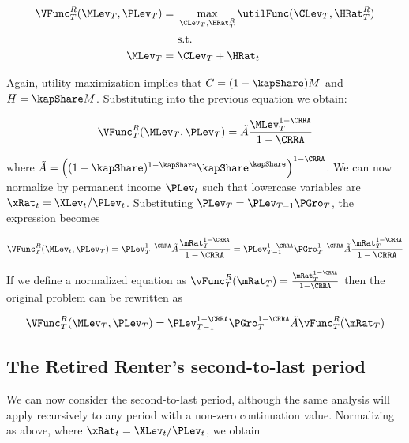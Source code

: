\documentclass[PortfolioChoiceWithRiskyHousing]{subfiles}
\begin{document}
\begin{equation}
	\begin{split}
		\VFunc^R_{T}(\MLev_{T}, \PLev_{T}) = &~ \max_{\CLev_{T}, \HRat^R_{T}} \utilFunc(\CLev_{T}, \HRat^R_{T}) \\
		&~ \text{s.t.} \\
		\MLev_{T} = &~ \CLev_{T} + \HRat_{t}
	\end{split}
\end{equation}

Again, utility maximization implies that $C = (1-\kapShare)M$ and $H = \kapShare M$. Substituting into the previous equation we obtain:

\begin{equation}
	\VFunc^R_{T}(\MLev_{T}, \PLev_{T}) = \tilde{A} \frac{\MLev_{T}^{1-\CRRA}}{1-\CRRA}
\end{equation}

where $\tilde{A} = \left( (1-\kapShare)^{1-\kapShare} \kapShare^\kapShare \right)^{1-\CRRA}$. We can now normalize by permanent income $\PLev_{t}$ such that lowercase variables are $\xRat_{t} = \XLev_{t} / \PLev_{t}$. Substituting $\PLev_{T} = \PLev_{T-1} \PGro_{T}$, the expression becomes

\begin{equation}
	\VFunc^R_{T}(\MLev_{t}, \PLev_{T}) = \PLev_{T}^{1-\CRRA} \tilde{A} \frac{ \mRat_{T}^{1-\CRRA}}{1-\CRRA} = \PLev_{T-1}^{1-\CRRA} \PGro_{T}^{1-\CRRA} \tilde{A} \frac{\mRat_{T}^{1-\CRRA}}{1-\CRRA}
\end{equation}

If we define a normalized equation as $\vFunc^R_{T}(\mRat_{T}) = \frac{\mRat_{T}^{1-\CRRA}}{1-\CRRA}$ then the original problem can be rewritten as

\begin{equation}
	\VFunc^R_{T}(\MLev_{T}, \PLev_{T}) = \PLev_{T-1}^{1-\CRRA} \PGro_{T}^{1-\CRRA} \tilde{A} \vFunc^R_{T}(\mRat_{T})
\end{equation}

\subsection{The Retired Renter's second-to-last period}

We can now consider the second-to-last period, although the same analysis will apply recursively to any period with a non-zero continuation value. Normalizing as above, where $\xRat_{t} = \XLev_{t} / \PLev_{t}$, we obtain
\end{document}
